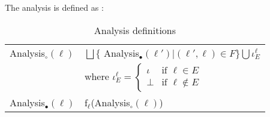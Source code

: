 The analysis is defined as :
\begin{table}
\begin{tabular}{| l | l |}
  \hline
  Analysis$_\circ(\ell)$ & $ \bigsqcup \{$ Analysis$_\bullet (\ell') | (\ell', \ell) \in F \} \bigcup \iota_E^{\ell} $ \\
                         & where $\iota_E^{\ell} = \begin{cases} \iota & \text{if } \ell \in E \\ 
                                                                 \bot  & \text{if } \ell \notin E
                                                   \end{cases}$\\
  \hline
  Analysis$_\bullet(\ell)$ & f$_\ell$(Analysis$_\circ(\ell)$)\\
  \hline
\end{tabular}
\centering
\caption{Analysis definitions}
\end{table}


